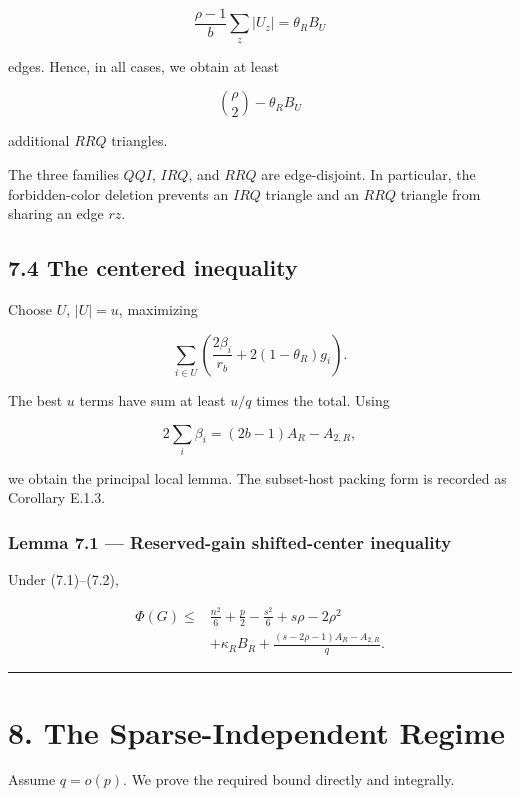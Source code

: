 \documentclass[
  american,
  11pt,
  a4paper,
]{article}
\begin{document}
\[
\frac{\rho-1}{b}\sum_z|U_z|
=
\theta_RB_U
\]

edges. Hence, in all cases, we obtain at least

\[
\binom\rho2-\theta_RB_U
\]

additional \(RRQ\) triangles.

The three families \(QQI\), \(IRQ\), and \(RRQ\) are edge-disjoint. In particular, the forbidden-color deletion prevents an \(IRQ\) triangle and an \(RRQ\) triangle from sharing an edge \(rz\).

\subsection{7.4 The centered inequality}\label{the-centered-inequality}

Choose \(U\), \(|U|=u\), maximizing

\[
\sum_{i\in U}
\left(
\frac{2\beta_i}{r_b}+2(1-\theta_R)g_i
\right).
\]

The best \(u\) terms have sum at least \(u/q\) times the total. Using

\[
2\sum_i\beta_i
=(2b-1)A_R-A_{2,R},
\]

we obtain the principal local lemma. The subset-host packing form is recorded as Corollary E.1.3.

\subsubsection{Lemma 7.1 --- Reserved-gain shifted-center inequality}\label{lemma-7.1-reserved-gain-shifted-center-inequality}

Under (7.1)--(7.2),

\[
\boxed{
\begin{aligned}
\Phi(G)
\le{}&
\frac{n^2}{6}+\frac p2-\frac{s^2}{6}
+s\rho-2\rho^2\\
&+
\kappa_RB_R
+
\frac{(s-2\rho-1)A_R-A_{2,R}}q.
\end{aligned}
}
\tag{7.6}
\]

\begin{center}\rule{0.5\linewidth}{0.5pt}\end{center}

\section{8. The Sparse-Independent Regime}\label{the-sparse-independent-regime}

Assume \(q=o(p)\). We prove the required bound directly and integrally.
\end{document}

